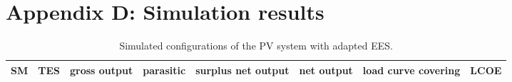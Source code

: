 \chapter{Appendix D: Simulation results} \label{Simulation results}
%

\begin{sidewaystable} 
  \centering
\begin{tabular}{ p{2.0cm} C{2.0cm} C{2.0cm} C{2.0cm} C{2.0cm} C{2.0cm} C{2.0cm} C{2.0cm} } 
	\hline	
\textbf{SM} & \textbf{TES} & \textbf{gross output} & \textbf{parasitic} & \textbf{surplus net output} & \textbf{net output} & \textbf{load curve covering} & \textbf{LCOE} \\ \hline \hline
\end{tabular}
\caption[Simulated configurations of the PV system with adapted EES.]{Simulated configurations of the PV system with adapted EES.}\label{tbl: PV_OverallConfig}
\end{sidewaystable} 



\pagebreak